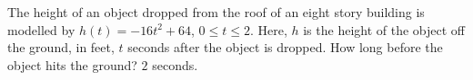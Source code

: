 {The height of an object dropped from the roof of an eight story building is modelled by  $h(t) = -16t^2 + 64$, $0 \leq t \leq 2$. Here,  $h$ is the height of the object off the ground, in feet, $t$ seconds after the object is dropped.  How long before the object hits the ground?}
{$2$ seconds.}